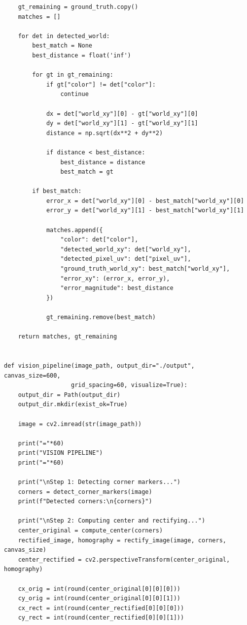 \documentclass{article}
\begin{document}
\begin{latin}
\begin{LTR}
\begin{verbatim}
    gt_remaining = ground_truth.copy()
    matches = []
    
    for det in detected_world:
        best_match = None
        best_distance = float('inf')
        
        for gt in gt_remaining:
            if gt["color"] != det["color"]:
                continue
            
            dx = det["world_xy"][0] - gt["world_xy"][0]
            dy = det["world_xy"][1] - gt["world_xy"][1]
            distance = np.sqrt(dx**2 + dy**2)
            
            if distance < best_distance:
                best_distance = distance
                best_match = gt
        
        if best_match:
            error_x = det["world_xy"][0] - best_match["world_xy"][0]
            error_y = det["world_xy"][1] - best_match["world_xy"][1]
            
            matches.append({
                "color": det["color"],
                "detected_world_xy": det["world_xy"],
                "detected_pixel_uv": det["pixel_uv"],
                "ground_truth_world_xy": best_match["world_xy"],
                "error_xy": (error_x, error_y),
                "error_magnitude": best_distance
            })
            
            gt_remaining.remove(best_match)
    
    return matches, gt_remaining


def vision_pipeline(image_path, output_dir="./output", canvas_size=600, 
                   grid_spacing=60, visualize=True):
    output_dir = Path(output_dir)
    output_dir.mkdir(exist_ok=True)
    
    image = cv2.imread(str(image_path))
    
    print("="*60)
    print("VISION PIPELINE")
    print("="*60)
    
    print("\nStep 1: Detecting corner markers...")
    corners = detect_corner_markers(image)
    print(f"Detected corners:\n{corners}")
    
    print("\nStep 2: Computing center and rectifying...")
    center_original = compute_center(corners)
    rectified_image, homography = rectify_image(image, corners, canvas_size)
    center_rectified = cv2.perspectiveTransform(center_original, homography)
    
    cx_orig = int(round(center_original[0][0][0]))
    cy_orig = int(round(center_original[0][0][1]))
    cx_rect = int(round(center_rectified[0][0][0]))
    cy_rect = int(round(center_rectified[0][0][1]))
    

\end{verbatim}
\end{LTR}
\end{latin}
\end{document}
